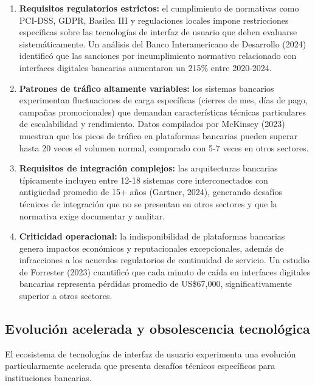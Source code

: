 \begin{enumerate}
  \item \textbf{Requisitos regulatorios estrictos:} el cumplimiento de normativas
        como PCI-DSS, GDPR, Basilea III y regulaciones locales impone
        restricciones específicas sobre las tecnologías de interfaz de usuario
        que deben evaluarse sistemáticamente. Un análisis del Banco
        Interamericano de Desarrollo (2024) identificó que las sanciones por
        incumplimiento normativo relacionado con interfaces digitales
        bancarias aumentaron un 215\% entre 2020-2024.
  \item \textbf{Patrones de tráfico altamente variables:} los sistemas bancarios
        experimentan fluctuaciones de carga específicas (cierres de mes, días de
        pago, campañas promocionales) que demandan características
        técnicas particulares de escalabilidad y rendimiento. Datos compilados
        por McKinsey (2023) muestran que los picos de tráfico en plataformas
        bancarias pueden superar hasta 20 veces el volumen normal, comparado
        con 5-7 veces en otros sectores.
  \item \textbf{Requisitos de integración complejos:} las arquitecturas bancarias
        típicamente incluyen entre 12-18 sistemas core interconectados con
        antigüedad promedio de 15+ años (Gartner, 2024), generando desafíos
        técnicos de integración que no se presentan en otros sectores y que la
        normativa exige documentar y auditar.
  \item \textbf{Criticidad operacional:} la indisponibilidad de plataformas
        bancarias genera impactos económicos y reputacionales excepcionales,
        además de infracciones a los acuerdos regulatorios de continuidad de
        servicio. Un estudio de Forrester (2023) cuantificó que cada minuto de
        caída en interfaces digitales bancarias representa pérdidas promedio de
        US\$67,000, significativamente superior a otros sectores.
\end{enumerate}

\subsection*{Evolución acelerada y obsolescencia tecnológica}

El ecosistema de tecnologías de interfaz de usuario experimenta una
evolución particularmente acelerada que presenta desafíos técnicos
específicos para instituciones bancarias.

